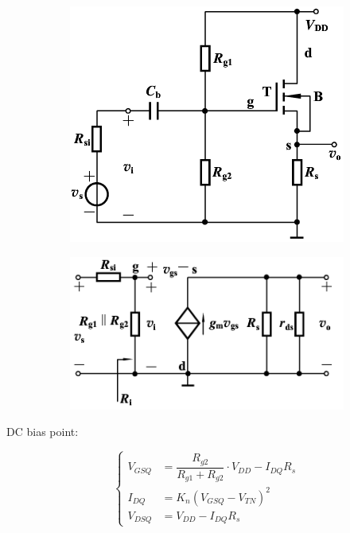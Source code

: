 \begin{figure}[H]
  \centering
  \begin{subfigure}{.5\textwidth}
    \centering
    \includegraphics[width=\linewidth]{figures/MOSFET-Common-D}
  \end{subfigure}
  \begin{subfigure}{.45\textwidth}
    \centering
    \includegraphics[width=\linewidth]{figures/MOSFET-Common-Ds}
  \end{subfigure}
\end{figure}

DC bias point:

\begin{equation*}
  \left\{
  \begin{aligned}
    V_{GSQ} &= \dfrac{R_{g2}}{R_{g1} + R_{g2}} \cdot V_{DD} - I_{DQ} R_s  \\
    I_{DQ} &= K_n \left( V_{GSQ} - V_{TN} \right)^2 \\
    V_{DSQ} &= V_{DD} - I_{DQ} R_s
  \end{aligned}
  \right.
\end{equation*}


